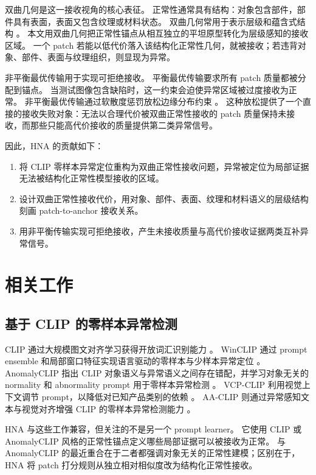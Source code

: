 \documentclass[10pt,fontset=none]{ctexart}
\newcommand{\method}{HNA}
\begin{document}
双曲几何是这一接收视角的核心表征。
正常性通常具有结构：对象包含部件，部件具有表面，表面又包含纹理或材料状态。
双曲几何常用于表示层级和蕴含式结构 \cite{nickel2017poincare,ganea2018entailment,desai2023meru}。
本文用双曲几何把正常性锚点从相互独立的平坦原型转化为层级感知的接收区域。
一个 patch 若能以低代价落入该结构化正常性几何，就被接收；若违背对象、部件、表面与纹理组织，则显现为异常。

非平衡最优传输用于实现可拒绝接收。
平衡最优传输要求所有 patch 质量都被分配到锚点。
当测试图像包含缺陷时，这一约束会迫使异常区域被过度接收为正常。
非平衡最优传输通过软散度惩罚放松边缘分布约束 \cite{cuturi2013sinkhorn,chizat2018uot}。
这种放松提供了一个直接的接收失败对象：无法以合理代价被双曲正常性接收的 patch 质量保持未接收，而那些只能高代价接收的质量提供第二类异常信号。

因此，\method{} 的贡献如下：
\begin{enumerate}[leftmargin=*]
    \item 将 CLIP 零样本异常定位重构为双曲正常性接收问题，异常被定位为局部证据无法被结构化正常性模型接收的区域。
    \item 设计双曲正常性接收代价，用对象、部件、表面、纹理和材料语义的层级结构刻画 patch-to-anchor 接收关系。
    \item 用非平衡传输实现可拒绝接收，产生未接收质量与高代价接收证据两类互补异常信号。
\end{enumerate}

\section{相关工作}

\subsection{基于 CLIP 的零样本异常检测}

CLIP 通过大规模图文对齐学习获得开放词汇识别能力 \cite{radford2021clip}。
WinCLIP 通过 prompt ensemble 和局部窗口特征实现语言驱动的零样本与少样本异常定位 \cite{jeong2023winclip}。
AnomalyCLIP 指出 CLIP 对象语义与异常语义之间存在错配，并学习对象无关的 normality 和 abnormality prompt 用于零样本异常检测 \cite{zhou2024anomalyclip}。
VCP-CLIP 利用视觉上下文调节 prompt，以降低对已知产品类别的依赖 \cite{qu2024vcpclip}。
AA-CLIP 则通过异常感知文本与视觉对齐增强 CLIP 的零样本异常检测能力 \cite{ma2025aaclip}。

\method{} 与这些工作兼容，但关注的不是另一个 prompt learner。
它使用 CLIP 或 AnomalyCLIP 风格的正常性锚点定义哪些局部证据可以被接收为正常。
与 AnomalyCLIP 的最近重合在于二者都强调对象无关的正常性建模；区别在于，\method{} 将 patch 打分规则从独立相对相似度改为结构化正常性接收。
\end{document}
